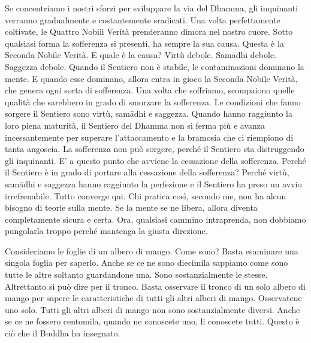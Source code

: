 Se concentriamo i nostri sforzi per sviluppare la via del Dhamma, gli
inquinanti verranno gradualmente e costantemente sradicati. Una volta
perfettamente coltivate, le Quattro Nobili Verità prenderanno dimora nel
nostro cuore. Sotto qualsiasi forma la sofferenza si presenti, ha sempre
la sua causa. Questa è la Seconda Nobile Verità. E quale è la causa?
Virtù debole. Samādhi debole. Saggezza debole. Quando il Sentiero non è
stabile, le contaminazioni dominano la mente. E quando esse dominano,
allora entra in gioco la Seconda Nobile Verità, che genera ogni sorta di
sofferenza. Una volta che soffriamo, scompaiono quelle qualità che
sarebbero in grado di smorzare la sofferenza. Le condizioni che fanno
sorgere il Sentiero sono virtù, samādhi e saggezza. Quando hanno
raggiunto la loro piena maturità, il Sentiero del Dhamma non si ferma
più e avanza incessantemente per superare l'attaccamento e la bramosia
che ci riempiono di tanta angoscia. La sofferenza non può sorgere,
perché il Sentiero sta distruggendo gli inquinanti. E' a questo punto
che avviene la cessazione della sofferenza. Perché il Sentiero è in
grado di portare alla cessazione della sofferenza? Perché virtù, samādhi
e saggezza hanno raggiunto la perfezione e il Sentiero ha preso un avvio
irrefrenabile. Tutto converge qui. Chi pratica così, secondo me, non ha
alcun bisogno di teorie sulla mente. Se la mente se ne libera, allora
diventa completamente sicura e certa. Ora, qualsiasi cammino
intraprenda, non dobbiamo pungolarla troppo perché mantenga la giusta
direzione.

Consideriamo le foglie di un albero di mango. Come sono? Basta esaminare
una singola foglia per saperlo. Anche se ce ne sono diecimila sappiamo
come sono tutte le altre soltanto guardandone una. Sono sostanzialmente
le stesse. Altrettanto si può dire per il tronco. Basta osservare il
tronco di un solo albero di mango per sapere le caratteristiche di tutti
gli altri alberi di mango. Osservatene uno solo. Tutti gli altri alberi
di mango non sono sostanzialmente diversi. Anche se ce ne fossero
centomila, quando ne conoscete uno, li conoscete tutti. Questo è ciò che
il Buddha ha insegnato.

